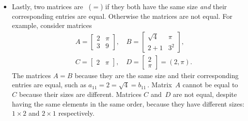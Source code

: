 \begin{itemize}
\item Lastly, two matrices are ~(\(=\)) if they both have the same size \emph{and} their corresponding entries are equal.
Otherwise the matrices are not equal.
For example, consider matrices
\begin{eqnarray*}&&
A=\begin{bmatrix} 2&\pi\\3&9 \end{bmatrix},\quad
B=\begin{bmatrix} \sqrt4&\pi\\2+1&3^2 \end{bmatrix},\\&&
C=\begin{bmatrix} 2&\pi \end{bmatrix},\quad
D=\begin{bmatrix} 2\\\pi \end{bmatrix}=(2,\pi).
\end{eqnarray*}
The matrices \(A=B\) because they are the same size and their  corresponding entries are equal, such as \(a_{11}=2=\sqrt4=b_{11}\)\,.
Matrix~\(A\) cannot be equal to~\(C\) because their sizes are different.
Matrices \(C\) and~\(D\) are not equal, despite having the same elements in the same order, because they have different sizes: \(1\times 2\) and \(2\times 1\) respectively.

\end{itemize}



